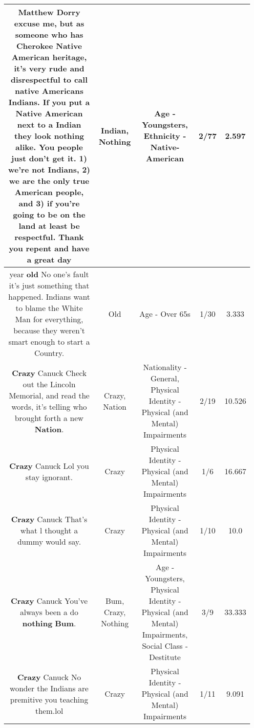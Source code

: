 \documentclass[11pt]{article}
\newlength\mylength
\begin{document}
\begin{center}
\begin{longtable}{|C{.65\mylength}|C{.30\mylength}|C{.12\mylength}|C{.12\mylength}|C{.12\mylength}|}
  \small Matthew Dorry excuse me, but as someone who has Cherokee Native American heritage, it's very rude and disrespectful to call native Americans Indians. If you put a Native American next to a \textbf{Indian} they look \textbf{nothing} alike. You people just don't get it. 1) we're not Indians, 2) we are the only true American people, and 3) if you're going to be on the land at least be respectful. Thank you repent and have a great day\normalsize   & Indian, Nothing & Age - Youngsters, Ethnicity - Native-American & 2/77 & 2.597 \\  \hline
  \small {} year \textbf{old} No one's fault it's just something that happened. Indians want to blame the White Man for everything, because they weren't smart enough to start a Country.\normalsize   & Old & Age - Over 65s & 1/30 & 3.333 \\  \hline
  \small \@\textbf{Crazy} Canuck Check out the Lincoln Memorial, and read the words, it's telling who brought forth a new \textbf{Nation}.\normalsize   & Crazy, Nation & Nationality - General, Physical Identity - Physical (and Mental) Impairments & 2/19 & 10.526 \\  \hline
  \small \@\textbf{Crazy} Canuck Lol you stay ignorant.\normalsize   & Crazy & Physical Identity - Physical (and Mental) Impairments & 1/6 & 16.667 \\  \hline
  \small \@\textbf{Crazy} Canuck That's what l thought a dummy would say.\normalsize   & Crazy & Physical Identity - Physical (and Mental) Impairments & 1/10 & 10.0 \\  \hline
  \small \@\textbf{Crazy} Canuck You've always been a do \textbf{nothing} \textbf{Bum}.\normalsize   & Bum, Crazy, Nothing & Age - Youngsters, Physical Identity - Physical (and Mental) Impairments, Social Class - Destitute & 3/9 & 33.333 \\  \hline
  \small \@\textbf{Crazy} Canuck No wonder the Indians are premitive you teaching them.lol\normalsize   & Crazy & Physical Identity - Physical (and Mental) Impairments & 1/11 & 9.091 \\  \hline

\end{longtable}
\end{center}
\end{document}

